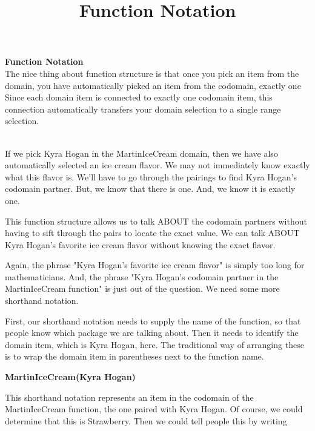 \documentclass{ximera}
\title{Function Notation}
\begin{document}
\begin{abstract}
\end{abstract}

\maketitle




\begin{remark} \textbf{Function Notation} \\
The nice thing about function structure is that once you pick an item from the domain, you have automatically picked an item from the codomain, exactly one  Since each domain item is connected to exactly one codomain item, this connection automatically transfers your domain selection to a single range selection.
\end{remark}
\quad \\


If we pick Kyra Hogan in the MartinIceCream domain, then we have also automatically selected an ice cream flavor.  We may not immediately know exactly what this flavor is. We'll have to go through the pairings to find Kyra Hogan's codomain partner.  But, we know that there is one. And, we know it is exactly one.

This function structure allows us to talk ABOUT the codomain partners without having to sift through the pairs to locate the exact value.  We can talk ABOUT Kyra Hogan's favorite ice cream flavor without knowing the exact flavor.  

Again, the phrase "Kyra Hogan's favorite ice cream flavor" is simply too long for mathematicians. And, the phrase "Kyra Hogan's codomain partner in the MartinIceCream function" is just out of the question. We need some more shorthand notation.

First, our shorthand notation needs to supply the name of the function, so that people know which package we are talking about.  Then it needs to identify the domain item, which is Kyra Hogan, here.  The traditional way of arranging these is to wrap the domain item in parentheses next to the function name.

\begin{center}
\textbf{MartinIceCream(Kyra Hogan)}
\end{center}

This shorthand notation represents an item in the codomain of the MartinIceCream function, the one paired with Kyra Hogan.  Of course, we could determine that this is Strawberry.  Then we could tell people this by writing
\end{document}
